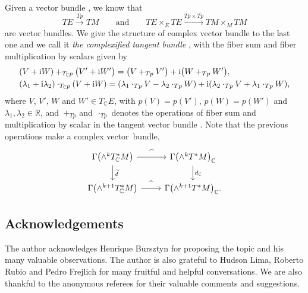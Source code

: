 \documentclass[pdftex]{sigma}
\numberwithin{equation}{section}
\newcommand{\R}{{\mathbb{R}}}
\newcommand{\C}{{\mathbb{C}}}
\begin{document}
Given a vector bundle , we know that
\[
TE\xrightarrow{Tp} TM \qquad \text{and}\qquad TE\times_E TE\xrightarrow{Tp\times Tp} TM \times _M TM
\]
 are vector bundles. We give the structure of complex vector bundle to the last one and we call it {\em the complexified tangent bundle} \smash{$T_{\C}E\xrightarrow{T_{\C}p} T_{\C}M$}, with the fiber sum and fiber multiplication by scalars given by
\begin{align*}
&(V+{\rm i} W)+_{T_{\C}p} \bigl(V'+{\rm i} W'\bigr)=\bigl(V+_{Tp} V'\bigr)+{\rm i}\bigl(W+_{Tp} W'\bigr),\\
&(\lambda_1+{\rm i}\lambda_2)\cdot_{T_{\C}p} (V+{\rm i}W)=(\lambda_1\cdot_{Tp} V-\lambda_2\cdot_{Tp} W) + {\rm i}(\lambda_2\cdot_{Tp} V + \lambda_1\cdot_{Tp} W),
\end{align*}
where $V$, $V'$, $W$ and $W'\in T_{\C}E$, with $p(V)=p(V')$, $p(W)=p(W')$ and $\lambda_1,\lambda_2\in \R$, and~$+_{Tp}$ and~$\cdot_{Tp}$ denotes the operations of fiber sum and multiplication by scalar in the tangent vector bundle . Note that the previous operations make \smash{$T_{\C}E\xrightarrow{T_{\C}p} T_{\C}M$} a complex vector~bundle,
\[
\begin{tikzcd}
\Gamma\bigl(\wedge^k T^*_{\C}M\bigr)\arrow[d, "\widetilde{d}"] \arrow[r, "\widehat{}"]
& \Gamma\bigl(\wedge^k T^*M\bigr)_{\C}\arrow[d, "d_{\C}"] \\
\Gamma\bigl(\wedge^{k+1} T^*_{\C}M\bigr)\arrow[r, "\widehat{}"]
& \Gamma\bigl(\wedge^{k+1} T^*M\bigr)_{\C}.
\end{tikzcd}
\]

\subsection*{Acknowledgements}
The author acknowledges Henrique Bursztyn for proposing the topic and his many valuable observations. The author is also grateful to Hudson Lima, Roberto Rubio and Pedro Frejlich for many fruitful and helpful conversations. We are also thankful to the anonymous referees for their valuable comments and suggestions.
\end{document}
